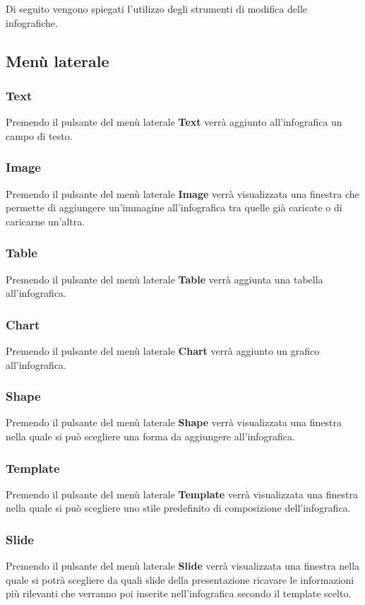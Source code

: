 \noindent
Di seguito vengono spiegati l'utilizzo degli strumenti di modifica delle infografiche.

\subsection{Menù laterale}
\subsubsection{Text}
Premendo il pulsante del menù laterale \textbf{Text} verrà aggiunto all'infografica un campo di testo.
\subsubsection{Image}
Premendo il pulsante del menù laterale \textbf{Image} verrà visualizzata una finestra che permette di aggiungere un'immagine all'infografica tra quelle già caricate o di caricarne un'altra.
\subsubsection{Table}
Premendo il pulsante del menù laterale \textbf{Table} verrà aggiunta una tabella all'infografica.
\subsubsection{Chart}
Premendo il pulsante del menù laterale \textbf{Chart} verrà aggiunto un grafico all'infografica.
\subsubsection{Shape}
Premendo il pulsante del menù laterale \textbf{Shape} verrà visualizzata una finestra nella quale si può scegliere una forma da aggiungere all'infografica.
\subsubsection{Template}
Premendo il pulsante del menù laterale \textbf{Template} verrà visualizzata una finestra nella quale si può scegliere uno stile predefinito di composizione dell'infografica.
\subsubsection{Slide}
Premendo il pulsante del menù laterale \textbf{Slide} verrà visualizzata una finestra nella quale si potrà scegliere da quali slide della presentazione ricavare le informazioni più rilevanti che verranno poi inserite nell'infografica secondo il template scelto.
